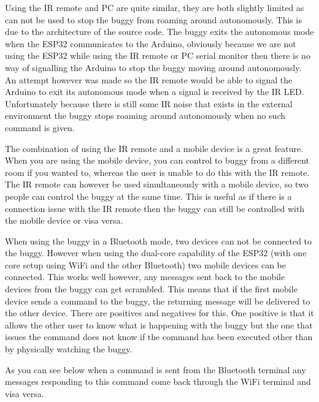 \documentclass[8pt, a4paper]{article}
\begin{document}
Using the IR remote and PC are quite similar, they are both slightly limited as can not be used to stop the buggy from roaming around autonomously. This is due to the architecture of the source code. The buggy exits the autonomous mode when the ESP32 communicates to the Arduino, obviously because we are not using the ESP32 while using the IR remote or PC serial monitor then there is no way of signalling the Arduino to stop the buggy moving around autonomously. An attempt however was made so the IR remote would be able to signal the Arduino to exit its autonomous mode when a signal is received by the IR LED. Unfortunately because there is still some IR noise that exists in the external environment the buggy stops roaming around autonomously when no such command is given. 

The combination of using the IR remote and a mobile device is a great feature. When you are using the mobile device, you can control to buggy from a different room if you wanted to, whereas the user is unable to do this with the IR remote. The IR remote can however be used simultaneously with a mobile device, so two people can control the buggy at the same time. This is useful as if there is a connection issue with the IR remote then the buggy can still be controlled with the mobile device or visa versa. 

When using the buggy in a Bluetooth mode, two devices can not be connected to the buggy. However when using the dual-core capability of the ESP32 (with one core setup using WiFi and the other Bluetooth) two mobile devices can be connected. This works well however, any messages sent back to the mobile devices from the buggy can get scrambled. This means that if the first mobile device sends a command to the buggy, the returning message will be delivered to the other device. There are positives and negatives for this. One positive is that it allows the other user to know what is happening with the buggy but the one that issues the command does not know if the command has been executed other than by physically watching the buggy. 

As you can see below when a command is sent from the Bluetooth terminal any messages responding to this command come back through the WiFi terminal and visa versa. 
	
\end{document}
